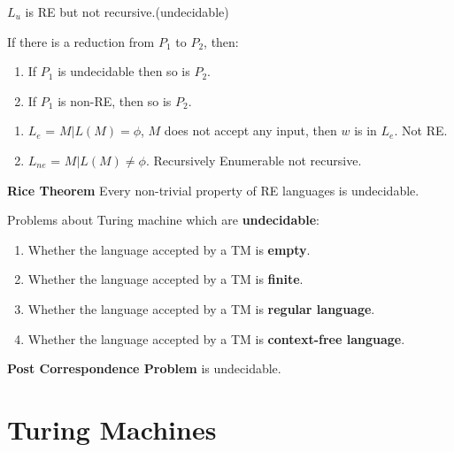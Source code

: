 \documentclass[a4paper,oneside]{book}
\begin{document}
\begin{definition}
$L_u$ is RE but not recursive.(undecidable)
\end{definition}
\begin{theorem}
If there is a reduction from $P_1$ to $P_2$, then:
\begin{enumerate}
\item If $P_1$ is undecidable then so is $P_2$.
\item If $P_1$ is non-RE, then so is $P_2$.
\end{enumerate}
\end{theorem}
\begin{theorem}
\begin{enumerate}
\item $L_e$ = $M | {L(M) = \phi}$, $M$ does not accept any input, then $w$ is in $L_e$. Not RE.
\item $L_{ne}$ = $M | {L(M) \neq \phi}$. Recursively Enumerable not recursive.
\end{enumerate}
\end{theorem}
\begin{theorem}
\textbf{Rice Theorem} Every non-trivial property of RE languages is undecidable.
\end{theorem}
Problems about Turing machine which are \textbf{undecidable}:
\begin{enumerate}
\item Whether the language accepted by a TM is \textbf{empty}.
\item Whether the language accepted by a TM is \textbf{finite}.
\item Whether the language accepted by a TM is \textbf{regular language}.
\item Whether the language accepted by a TM is \textbf{context-free language}.
\end{enumerate}
\begin{theorem}
\textbf{Post Correspondence Problem} is undecidable.
\end{theorem}
\chapter{Turing Machines}
\end{document}
